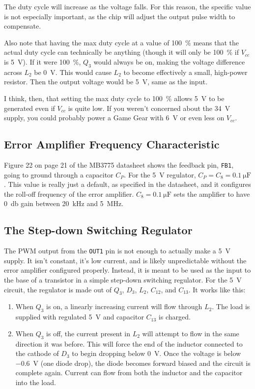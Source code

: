 \documentclass{article}
\newcommand{\Vcc}{$V_{cc}$}
\newcommand{\chippin}{\texttt}
\newcommand{\model}{\textsf}
\begin{document}
The duty cycle will increase as the voltage falls. For this reason,
the specific value is not especially important, as the chip will
adjust the output pulse width to compensate.

Also note that having the max duty cycle at a value of \qty{100}{\%}
means that the actual duty cycle can technically be anything (though
it will only be \qty{100}{\%} if \Vcc{} is \qty{5}{\volt}). If it were
\qty{100}{\%}, $Q_3$ would always be on, making the voltage difference
across $L_2$ be \qty{0}{\volt}. This would cause $L_2$ to become
effectively a small, high-power resistor. Then the output voltage
would be \qty{5}{\volt}, same as the input.

I think, then, that setting the max duty cycle to \qty{100}{\%} allows
\qty{5}{\volt} to be generated even if \Vcc{} is quite low. If you
weren't concerned about the \qty{34}{\volt} supply, you could probably
power a Game Gear with \qty{6}{\volt} or even less on \Vcc{}.


\subsection{Error Amplifier Frequency Characteristic}
Figure 22 on page 21 of the \model{MB3775} datasheet shows the
feedback pin, \chippin{FB1}, going to ground through a capacitor
$C_P$. For the \qty{5}{\volt} regulator,
$C_P = C_8 = \qty{0.1}{\micro\farad}$. This value is really just a
default, as specified in the datasheet, and it configures the roll-off
frequency of the error amplifier.  $C_8 = \qty{0.1}{\micro\farad}$
sets the amplifier to have \qty{0}{\decibel} gain between
\qty{20}{\kilo\hertz} and \qty{5}{\mega\hertz}.

\subsection{The Step-down Switching Regulator}
\label{sec:step-down_regulator}
The PWM output from the \chippin{OUT1} pin is not enough to actually
make a \qty{5}{\volt} supply. It isn't constant, it's low current, and
is likely unpredictable without the error amplifier configured
properly. Instead, it is meant to be used as the input to the base of
a transistor in a simple step-down switching regulator. For the
\qty{5}{\volt} circuit, the regulator is made out of $Q_3$, $D_3$,
$L_2$, $C_{12}$, and $C_{13}$. It works like this:

\begin{enumerate}
\item When $Q_3$ is on, a linearly increasing current will flow
  through $L_2$. The load is supplied with regulated \qty{5}{\volt}
  and capacitor $C_{13}$ is charged.
\item When $Q_3$ is off, the current present in $L_2$ will attempt to
  flow in the same direction it was before. This will force the end of
  the inductor connected to the cathode of $D_3$ to begin dropping
  below \qty{0}{\volt}. Once the voltage is below \qty{-0.6}{\volt}
  (one diode drop), the diode becomes forward biased and the circuit
  is complete again. Current can flow from both the inductor and the
  capacitor into the load.
\end{enumerate}
\end{document}
